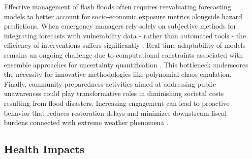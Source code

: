 Effective management of flash floods often requires reevaluating forecasting models to better account for socio-economic exposure metrics alongside hazard predictions. When emergency managers rely solely on subjective methods for integrating forecasts with vulnerability data - rather than automated tools - the efficiency of interventions suffers significantly \citep{Ritter2021b}. Real-time adaptability of models remains an ongoing challenge due to computational constraints associated with ensemble approaches for uncertainty quantification \citep{Zanchetta2020}. This bottleneck underscores the necessity for innovative methodologies like polynomial chaos emulation.
Finally, community-preparedness activities aimed at addressing public unawareness could play transformative roles in diminishing societal costs resulting from flood disasters. Increasing engagement can lead to proactive behavior that reduces restoration delays and minimizes downstream fiscal burdens connected with extreme weather phenomena \citep{Saad2024}.

\subsection{Health Impacts}
